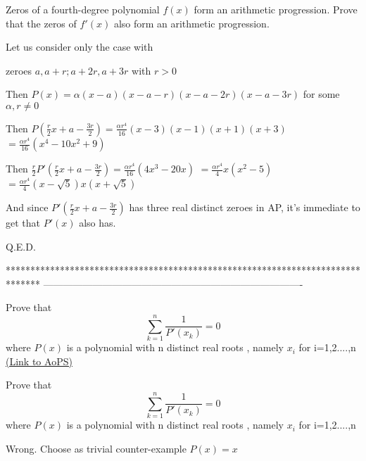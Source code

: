 \begin{solution}
	\begin{tcolorbox}Zeros of a fourth-degree polynomial $f (x)$ form an arithmetic progression. Prove that the zeros of $f '(x)$ also form an arithmetic progression.\end{tcolorbox}
Let us consider only the case with  zeroes $a,a+r;a+2r,a+3r$ with $r>0$

Then $P(x)=\alpha(x-a)(x-a-r)(x-a-2r)(x-a-3r)$ for some $\alpha,r\ne 0$

Then $P(\frac r2x+a-\frac{3r}2)=\frac{\alpha r^4}{16}(x-3)(x-1)(x+1)(x+3)$ $=\frac{\alpha r^4}{16}(x^4-10x^2+9)$

Then $\frac r2P'(\frac r2x+a-\frac{3r}2)=\frac{\alpha r^4}{16}(4x^3-20x)$ $=\frac{\alpha r^4}{4}x(x^2-5)$ $=\frac{\alpha r^4}{4}(x-\sqrt 5)x(x+\sqrt 5)$

And since $P'(\frac r2x+a-\frac{3r}2)$ has three real distinct zeroes in AP, it's immediate to get that $P'(x)$ also has.

Q.E.D.
\end{solution}
*******************************************************************************
-------------------------------------------------------------------------------

\begin{problem}
	Prove that \[ \sum_{k=1}^n\frac{1}{P'(x_k)}=0 \]
where $ P(x) $ is a polynomial with n distinct real roots , namely $ x_i $ for i=1,2....,n
	\flushright \href{https://artofproblemsolving.com/community/c6h617722}{(Link to AoPS)}
\end{problem}



\begin{solution}
	\begin{tcolorbox}Prove that \[ \sum_{k=1}^n\frac{1}{P'(x_k)}=0 \]
where $ P(x) $ is a polynomial with n distinct real roots , namely $ x_i $ for i=1,2....,n\end{tcolorbox}
Wrong. Choose as trivial counter-example $P(x)=x$
\end{solution}



